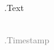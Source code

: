 \begin{flushright}
\colorbox{blue!20}{\parbox{0.7\textwidth}{ {{.Text}} }}
\\[0.1cm]
\small\textcolor{gray}{ {{.Timestamp}} }
\end{flushright}
